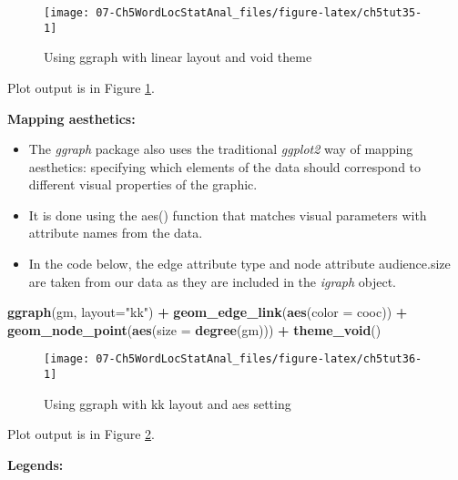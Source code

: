 \documentclass[
]{article}
\newenvironment{Shaded}{\begin{snugshade}}{\end{snugshade}}
\newcommand{\AttributeTok}[1]{\textcolor[rgb]{0.13,0.29,0.53}{#1}}
\newcommand{\FunctionTok}[1]{\textcolor[rgb]{0.13,0.29,0.53}{\textbf{#1}}}
\newcommand{\NormalTok}[1]{#1}
\newcommand{\SpecialCharTok}[1]{\textcolor[rgb]{0.81,0.36,0.00}{\textbf{#1}}}
\newcommand{\StringTok}[1]{\textcolor[rgb]{0.31,0.60,0.02}{#1}}
\providecommand{\tightlist}{%
  \setlength{\itemsep}{0pt}\setlength{\parskip}{0pt}}
\begin{document}
\begin{figure}

{\centering \texttt{[image: 07-Ch5WordLocStatAnal\_files/figure-latex/ch5tut35-1]} 

}

\caption{Using ggraph with linear layout and void theme}\label{fig:ch5tut35}
\end{figure}

Plot output is in Figure \ref{fig:ch5tut35}.

\textbf{Mapping aesthetics:}

\begin{itemize}
\tightlist
\item
  The \emph{ggraph} package also uses the traditional \emph{ggplot2} way of mapping aesthetics: specifying which elements of the data should correspond to different visual properties of the graphic.
\item
  It is done using the aes() function that matches visual parameters with attribute names from the data.
\item
  In the code below, the edge attribute type and node attribute audience.size are taken from our data as they are included in the \emph{igraph} object.
\end{itemize}

\begin{Shaded}
\begin{Highlighting}[]
\FunctionTok{ggraph}\NormalTok{(gm, }\AttributeTok{layout=}\StringTok{"kk"}\NormalTok{) }\SpecialCharTok{+}
  \FunctionTok{geom\_edge\_link}\NormalTok{(}\FunctionTok{aes}\NormalTok{(}\AttributeTok{color =}\NormalTok{ cooc)) }\SpecialCharTok{+}           
  \FunctionTok{geom\_node\_point}\NormalTok{(}\FunctionTok{aes}\NormalTok{(}\AttributeTok{size =} \FunctionTok{degree}\NormalTok{(gm))) }\SpecialCharTok{+}  
  \FunctionTok{theme\_void}\NormalTok{()}
\end{Highlighting}
\end{Shaded}

\begin{figure}

{\centering \texttt{[image: 07-Ch5WordLocStatAnal\_files/figure-latex/ch5tut36-1]} 

}

\caption{Using ggraph with kk layout and aes setting}\label{fig:ch5tut36}
\end{figure}

Plot output is in Figure \ref{fig:ch5tut36}.

\textbf{Legends:}
\end{document}
